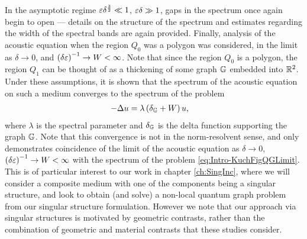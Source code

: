 In the asymptotic regime $\varepsilon\delta^{\frac{3}{2}}\ll 1$, $\varepsilon\delta\gg1$, gaps in the spectrum once again begin to open --- details on the structure of the spectrum and estimates regarding the width of the spectral bands are again provided.
Finally, analysis of the acoustic equation when the region $Q_0$ was a polygon \cite{figotin1998spectral} was considered, in the limit as $\delta\rightarrow0$, and $\left( \delta\varepsilon \right)^{-1}\rightarrow W<\infty$.
Note that since the region $Q_0$ is a polygon, the region $Q_1$ can be thought of as a thickening of some graph $\mathbb{G}$ embedded into $\mathbb{R}^2$.
Under these assumptions, it is shown that the spectrum of the acoustic equation on such a medium converges to the spectrum of the problem
\begin{align} \label{eq:Intro-KuchFigQGLimit}
	-\Delta u &= \lambda\left( \delta_{\mathbb{G}} + W \right)u,
\end{align}
where $\lambda$ is the spectral parameter and $\delta_{\mathbb{G}}$ is the delta function supporting the graph $\mathbb{G}$.
Note that this convergence is not in the norm-resolvent sense, and only demonstrates coincidence of the limit of the acoustic equation as $\delta\rightarrow0$, $\left( \delta\varepsilon \right)^{-1}\rightarrow W<\infty$ with the spectrum of the problem \eqref{eq:Intro-KuchFigQGLimit}.
This is of particular interest to our work in chapter \ref{ch:SingInc}, where we will consider a composite medium with one of the components being a singular structure, and look to obtain (and solve) a non-local quantum graph problem from our singular structure formulation.
However we note that our approach via singular structures is motivated by geometric contrasts, rather than the combination of geometric and material contrasts that these studies consider.
